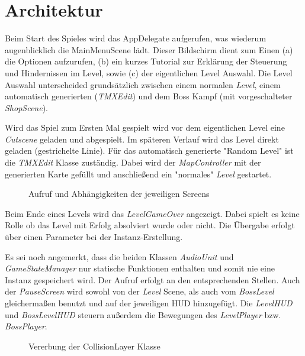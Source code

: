 \chapter{Architektur}

Beim Start des Spieles wird das AppDelegate aufgerufen, was wiederum augenblicklich die MainMenuScene lädt. Dieser Bildschirm dient zum Einen (a) die Optionen aufzurufen, (b) ein kurzes Tutorial zur Erklärung der Steuerung und Hindernissen im Level, sowie (c) der eigentlichen Level Auswahl.
Die Level Auswahl unterscheided grundsätzlich zwischen einem normalen \textit{Level}, einem automatisch generierten (\textit{TMXEdit}) und dem Boss Kampf (mit vorgeschalteter \textit{ShopScene}).

Wird das Spiel zum Ersten Mal gespielt wird vor dem eigentlichen Level eine \textit{Cutscene} geladen und abgespielt. Im späteren Verlauf wird das Level direkt geladen (gestrichelte Linie).
Für das automatisch generierte "Random Level" ist die \textit{TMXEdit} Klasse zuständig. Dabei wird der \textit{MapController} mit der generierten Karte gefüllt und anschließend ein "normales" \textit{Level} gestartet.

\begin{figure}[h]
\scalebox{0.7}{}
\caption{Aufruf und Abhängigkeiten der jeweiligen Screens}
\label{calltree}
\end{figure}


Beim Ende eines Levels wird das \textit{LevelGameOver} angezeigt. Dabei spielt es keine Rolle ob das Level mit Erfolg absolviert wurde oder nicht. Die Übergabe erfolgt über einen Parameter bei der Instanz-Erstellung.

Es sei noch angemerkt, dass die beiden Klassen \textit{AudioUnit} und \textit{GameStateManager} nur statische Funktionen enthalten und somit nie eine Instanz gespeichert wird. Der Aufruf erfolgt an den entsprechenden Stellen.
Auch der \textit{PauseScreen} wird sowohl von der \textit{Level} Scene, als auch vom \textit{BossLevel} gleichermaßen benutzt und auf der jeweiligen HUD hinzugefügt. Die \textit{LevelHUD} und \textit{BossLevelHUD} steuern außerdem die Bewegungen des \textit{LevelPlayer} bzw. \textit{BossPlayer}.

\begin{figure}[h]
\begin{center}

\end{center}
\caption{Vererbung der CollisionLayer Klasse}
\label{collision_layer_derive}
\end{figure}

